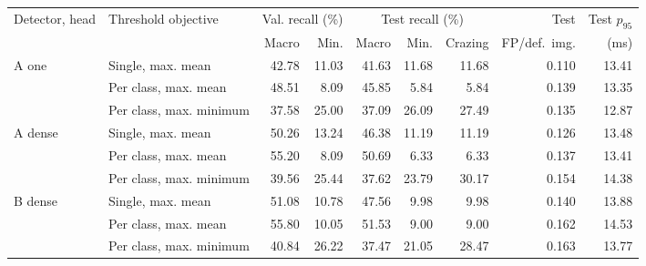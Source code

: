 \begin{tabular}{llrrrrrrr}\hline
Detector, head & Threshold objective & \multicolumn{2}{c}{Val. recall (\%)} & \multicolumn{3}{c}{Test recall (\%)} & Test & Test $p_{95}$ \\
 & & Macro & Min. & Macro & Min. & Crazing & FP/def.\ img. & (ms) \\ \hline
A one & Single, max. mean & 42.78 & 11.03 & 41.63 & 11.68 & 11.68 & 0.110 & 13.41 \\
 & Per class, max. mean & 48.51 & 8.09 & 45.85 & 5.84 & 5.84 & 0.139 & 13.35 \\
 & Per class, max. minimum & 37.58 & 25.00 & 37.09 & 26.09 & 27.49 & 0.135 & 12.87 \\
\hline
A dense & Single, max. mean & 50.26 & 13.24 & 46.38 & 11.19 & 11.19 & 0.126 & 13.48 \\
 & Per class, max. mean & 55.20 & 8.09 & 50.69 & 6.33 & 6.33 & 0.137 & 13.41 \\
 & Per class, max. minimum & 39.56 & 25.44 & 37.62 & 23.79 & 30.17 & 0.154 & 14.38 \\
\hline
B dense & Single, max. mean & 51.08 & 10.78 & 47.56 & 9.98 & 9.98 & 0.140 & 13.88 \\
 & Per class, max. mean & 55.80 & 10.05 & 51.53 & 9.00 & 9.00 & 0.162 & 14.53 \\
 & Per class, max. minimum & 40.84 & 26.22 & 37.47 & 21.05 & 28.47 & 0.163 & 13.77 \\
\hline
\end{tabular}
